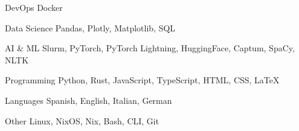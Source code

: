 

\begin{cvskills}

  \cvskill
    {DevOps} %
    {Docker} %

  \cvskill
    {Data Science} %
    {Pandas, Plotly, Matplotlib, SQL} %

  \cvskill
    {AI \& ML} %
    {Slurm, PyTorch, PyTorch Lightning, HuggingFace, Captum, SpaCy, NLTK} %

  \cvskill
    {Programming} %
    {Python, Rust, JavaScript, TypeScript, HTML, CSS, LaTeX} %

  \cvskill
    {Languages} %
    {Spanish, English, Italian, German} %

  \cvskill
    {Other}
    {Linux, NixOS, Nix, Bash, CLI, Git}

\end{cvskills}
